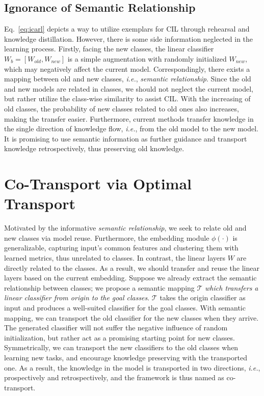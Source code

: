 \documentclass[sigconf]{acmart}
\newcommand{\T}{\mathcal{T}}
\newcommand{\ie}{\emph{i.e.}}
\begin{document}
\subsection{Ignorance of Semantic Relationship }
Eq.~\ref{eq:icarl} depicts a way to utilize exemplars for CIL through rehearsal and knowledge distillation. However, there is some side information neglected in the learning process. Firstly, facing the new classes, the linear classifier $W_b=[W_{old}, W_{new}]$ is a simple augmentation  with randomly initialized $W_{new}$, which may negatively affect the current model. 
Correspondingly, there exists a mapping between old and new classes, \ie, \emph{semantic relationship}. Since the old and new models are related in classes, we should not neglect the current model, but rather utilize the class-wise similarity to assist CIL. 
With the increasing of old classes, the probability of new classes related to old ones also increases, making the transfer easier.
Furthermore, current methods transfer knowledge in the single direction of knowledge flow, \ie, from the old model to the new model. It is promising to use semantic information as further guidance
and transport knowledge retrospectively, thus preserving old knowledge.

\section{Co-Transport via Optimal Transport}
Motivated by the informative \emph{semantic relationship}, we seek to relate old and new classes via model reuse. Furthermore, the embedding module $\phi(\cdot)$ is generalizable, capturing input's common features and clustering them with learned metrics, thus unrelated to classes. In contrast, the linear layers $W$ are directly related to the classes. As a result, we should transfer and reuse the linear layers based on the current embedding. 
Suppose we already extract the semantic relationship between  classes; we propose a semantic mapping $\T$ \emph{which transfers a linear classifier from origin to the goal classes}.  $\T$ takes the origin classifier as input and produces a well-suited classifier for the goal classes. With semantic mapping, we can transport the old classifier for the new classes when they arrive. The generated classifier will not suffer the negative influence of random initialization, but rather act as a promising starting point for new classes. 
Symmetrically, we can transport the new classifiers to the old classes when learning new tasks, and encourage knowledge preserving with the transported one. As a result, the knowledge in the model is transported in two directions, \ie, prospectively and retrospectively, and the framework is thus named as co-transport.
\end{document}
